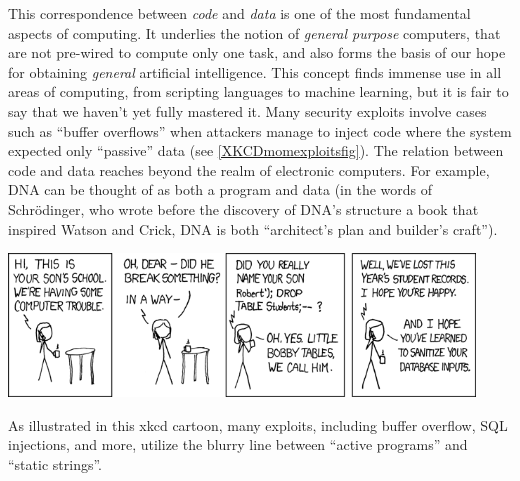 \hypertarget{programisinput}{}

This correspondence between \emph{code} and \emph{data} is one of the
most fundamental aspects of computing. It underlies the notion of
\emph{general purpose} computers, that are not pre-wired to compute only
one task, and also forms the basis of our hope for obtaining
\emph{general} artificial intelligence. This concept finds immense use
in all areas of computing, from scripting languages to machine learning,
but it is fair to say that we haven't yet fully mastered it. Many
security exploits involve cases such as ``buffer overflows'' when
attackers manage to inject code where the system expected only
``passive'' data (see \cref{XKCDmomexploitsfig}). The relation between
code and data reaches beyond the realm of electronic computers. For
example, DNA can be thought of as both a program and data (in the words
of Schrödinger, who wrote before the discovery of DNA's structure a book
that inspired Watson and Crick, DNA is both ``architect's plan and
builder's craft'').


\begin{marginfigure}
\centering
\includegraphics[width=\linewidth, height=1.5in, keepaspectratio]{../figure/exploits_of_a_mom.png}
\caption{As illustrated in this xkcd cartoon, many exploits, including
buffer overflow, SQL injections, and more, utilize the blurry line
between ``active programs'' and ``static strings''.}
\label{XKCDmomexploitsfig}
\end{marginfigure}

